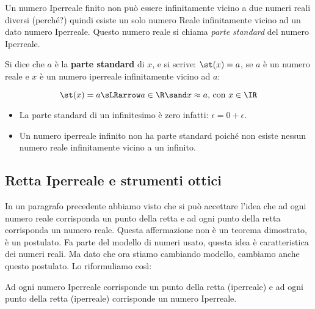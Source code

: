 Un numero Iperreale finito non può essere infinitamente vicino 
a due numeri reali diversi (perché?) quindi esiste un solo numero Reale 
infinitamente vicino ad un dato numero Iperreale. 
Questo numero reale si chiama \emph{parte standard} del numero Iperreale.

% 

\begin{definizione}
 Si dice che \(a\) è la \textbf{parte standard} di \(x\), e si scrive: 
 \(\st(x) = a\), se \(a\) è un numero reale e \(x\) è un numero iperreale
infinitamente vicino ad \(a\):

\[\st(x) = a \sLRarrow a \in \R \sand x \approx a\mbox{, con }x\in \IR\]
\end{definizione}

\begin{osservazione}
\begin{itemize} [nosep]
 \item 
La parte standard di un infinitesimo è zero infatti:
\(\epsilon = 0+\epsilon\).
 \item 
Un numero iperreale infinito non ha parte standard poiché non esiste nessun 
numero reale infinitamente vicino a un infinito.
\end{itemize}
\end{osservazione}

\subsection{Retta Iperreale e strumenti ottici}
\label{subsec:insnum_retta}

In un paragrafo precedente abbiamo visto che si può accettare l'idea che 
ad ogni numero reale corrisponda un punto della retta e ad ogni 
punto della retta corrisponda un numero reale. 
Questa affermazione non è un teorema dimostrato, è un postulato. 
Fa parte del modello di numeri usato, questa idea è caratteristica dei 
numeri reali. 
Ma dato che ora stiamo cambiando modello, cambiamo anche questo postulato. 
Lo riformuliamo così:

\begin{postulato}
Ad ogni numero Iperreale corrisponde un punto della retta (iperreale) e ad 
ogni punto della retta (iperreale) corrisponde un numero Iperreale.
\end{postulato}


